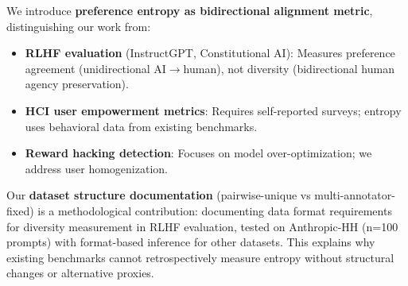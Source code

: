 We introduce \textbf{preference entropy as bidirectional alignment metric}, distinguishing our work from:
\begin{itemize}
\item \textbf{RLHF evaluation} (InstructGPT, Constitutional AI): Measures preference agreement (unidirectional AI$\rightarrow$human), not diversity (bidirectional human agency preservation).
\item \textbf{HCI user empowerment metrics}: Requires self-reported surveys; entropy uses behavioral data from existing benchmarks.
\item \textbf{Reward hacking detection}: Focuses on model over-optimization; we address user homogenization.
\end{itemize}

Our \textbf{dataset structure documentation} (pairwise-unique vs multi-annotator-fixed) is a methodological contribution: documenting data format requirements for diversity measurement in RLHF evaluation, tested on Anthropic-HH (n=100 prompts) with format-based inference for other datasets. This explains why existing benchmarks cannot retrospectively measure entropy without structural changes or alternative proxies.
